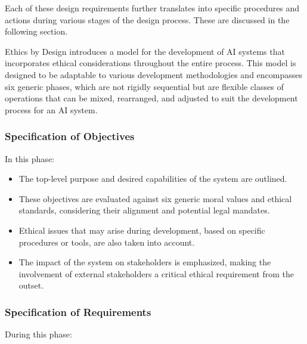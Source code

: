 \documentclass{article}
\begin{document}
Each of these design requirements further translates into specific procedures and actions during various stages of the design process. These are discussed in the following section.  

Ethics by Design introduces a model for the development of AI systems that incorporates ethical considerations throughout the entire process. This model is designed to be adaptable to various development methodologies and encompasses six generic phases, which are not rigidly sequential but are flexible classes of operations that can be mixed, rearranged, and adjusted to suit the development process for an AI system.

\subsubsection{Specification of Objectives}

In this phase:

\begin{itemize}

    \item The top-level purpose and desired capabilities of the system are outlined.

    \item These objectives are evaluated against six generic moral values and ethical standards, considering their alignment and potential legal mandates.

    \item Ethical issues that may arise during development, based on specific procedures or tools, are also taken into account.

    \item The impact of the system on stakeholders is emphasized, making the involvement of external stakeholders a critical ethical requirement from the outset.

\end{itemize}

\subsubsection{Specification of Requirements}

During this phase:
\end{document}
